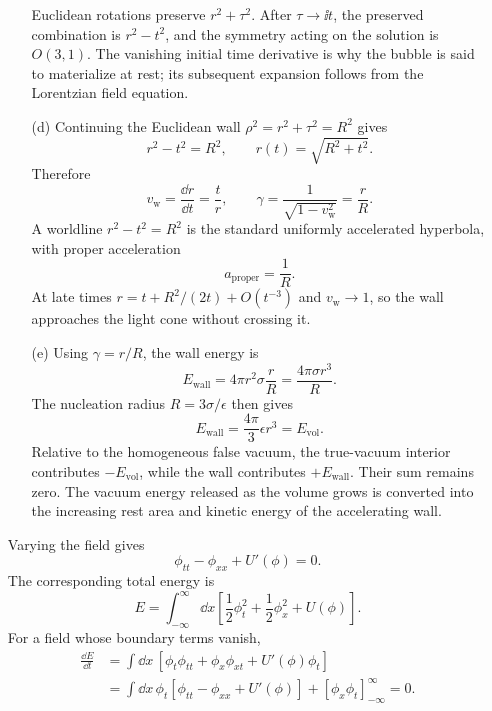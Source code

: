\begin{enumerate}
\begin{enumerate}
    Euclidean rotations preserve \(r^2+\tau^2\).  After
    \(\tau\to \ii t\), the preserved combination is \(r^2-t^2\), and the
    symmetry acting on the solution is \(O(3,1)\).  The vanishing initial
    time derivative is why the bubble is said to materialize at rest;
    its subsequent expansion follows from the Lorentzian field equation.
    \item[(d)]
    Continuing the Euclidean wall \(\rho^2=r^2+\tau^2=R^2\) gives
    \[
      r^2-t^2=R^2,\qquad
      \boxed{r(t)=\sqrt{R^2+t^2}.}
    \]
    Therefore
    \[
      v_{\mathrm w}=\frac{\dd r}{\dd t}=\frac t r,\qquad
      \gamma=\frac1{\sqrt{1-v_{\mathrm w}^2}}=\frac rR.
    \]
    A worldline \(r^2-t^2=R^2\) is the standard uniformly accelerated
    hyperbola, with proper acceleration
    \[
      \boxed{a_{\mathrm{proper}}=\frac1R.}
    \]
    At late times
    \(r=t+R^2/(2t)+O(t^{-3})\) and
    \(v_{\mathrm w}\to1\), so the wall approaches the light cone without
    crossing it.
    \item[(e)]
    Using \(\gamma=r/R\), the wall energy is
    \[
      E_{\mathrm{wall}}
        =4\pi r^2\sigma\frac rR
        =\frac{4\pi\sigma r^3}{R}.
    \]
    The nucleation radius \(R=3\sigma/\epsilon\) then gives
    \[
      \boxed{E_{\mathrm{wall}}
        =\frac{4\pi}{3}\epsilon r^3=E_{\mathrm{vol}}.}
    \]
    Relative to the homogeneous false vacuum, the true-vacuum interior
    contributes \(-E_{\mathrm{vol}}\), while the wall contributes
    \(+E_{\mathrm{wall}}\).  Their sum remains zero.  The vacuum energy
    released as the volume grows is converted into the increasing rest
    area and kinetic energy of the accelerating wall.
  \end{enumerate}

  Varying the field gives
  \[
    \boxed{\phi_{tt}-\phi_{xx}+U'(\phi)=0.}
  \]
  The corresponding total energy is
  \[
    E=\int_{-\infty}^{\infty}\dd x\left[
      \frac12\phi_t^2+\frac12\phi_x^2+U(\phi)\right].
  \]
  For a field whose boundary terms vanish,
  \[
  \begin{split}
    \frac{\dd E}{\dd t}
      &=\int \dd x\,[\phi_t\phi_{tt}+\phi_x\phi_{xt}
                    +U'(\phi)\phi_t]\\
      &=\int \dd x\,\phi_t[\phi_{tt}-\phi_{xx}+U'(\phi)]
        +[\phi_x\phi_t]_{-\infty}^{\infty}=0.
  \end{split}
  \]


\end{enumerate}
